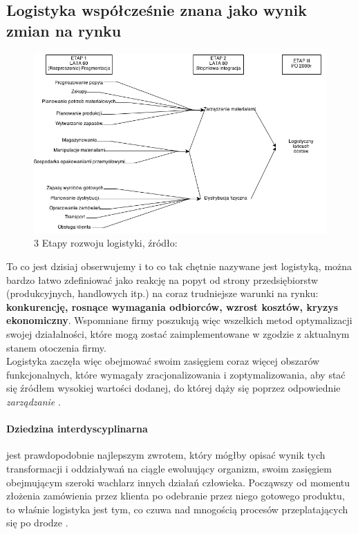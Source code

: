 	\subsection{Logistyka współcześnie znana jako wynik zmian na rynku}
		\begin{figure}[h]
			\centering
			\includegraphics[width=\textwidth]{images/etapy_rozwoju_logistyki}
			\caption[3 etapy rozwoju logistyki]{
				3 Etapy rozwoju logistyki, źródło: \cite{logityka_w_przedsiebiorstwie_sarsjusz_wolski_skowronek}
			}
		\end{figure}
		To co jest dzisiaj obserwujemy i to co tak chętnie nazywane jest logistyką, 
		można bardzo łatwo zdefiniować jako reakcję na popyt od
		strony przedsiębiorstw (produkcyjnych, handlowych itp.) na coraz trudniejsze warunki na
		rynku: \textbf{konkurencję, rosnące wymagania odbiorców, wzrost kosztów, kryzys ekonomiczny}.
		Wspomniane firmy poszukują więc wszelkich metod optymalizacji swojej działalności, 
		które mogą zostać zaimplementowane w zgodzie z aktualnym stanem otoczenia firmy.\\
		
		Logistyka zaczęła więc obejmować swoim zasięgiem coraz więcej obszarów funkcjonalnych, które
		wymagały zracjonalizowania i zoptymalizowania, aby stać się źródłem wysokiej wartości dodanej, do której
		dąży się poprzez odpowiednie \emph{zarządzanie} \cite{logistyka_jako_dziedzina_wiedzy_cz1}.		
		
		\paragraph{Dziedzina interdyscyplinarna} jest prawdopodobnie najlepszym zwrotem, 
		który mógłby opisać wynik tych transformacji i oddziaływań na ciągle ewoluujący organizm, swoim
		zasięgiem obejmującym szeroki wachlarz innych działań człowieka. Począwszy od momentu złożenia
		zamówienia przez klienta po odebranie przez niego gotowego produktu, to właśnie logistyka jest
		tym, co czuwa nad mnogością procesów przeplatających się po drodze \cite{logistyka_jako_dziedzina_wiedzy_cz2}.	
		
